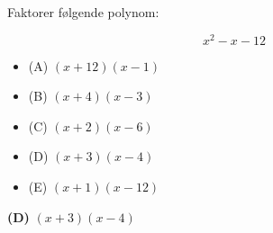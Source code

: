 

Faktorer følgende polynom:

$$x^2 - x - 12$$

\begin{itemize}
\item{(A)} $(x + 12)(x - 1)$
\vskip 5pt 
\item{(B)} $(x + 4)(x - 3)$
\vskip 5pt 
\item{(C)} $(x + 2)(x - 6)$
\vskip 5pt 
\item{(D)} $(x + 3)(x - 4)$
\vskip 5pt 
\item{(E)} $(x + 1)(x - 12)$
\end{itemize}







{\bf (D)} $(x + 3)(x - 4)$









